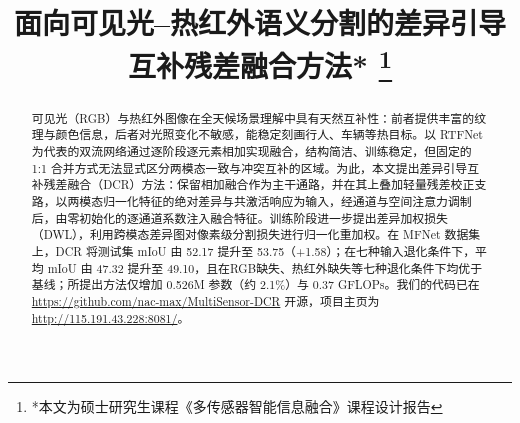 \documentclass[10pt,conference]{IEEEtran}
\begin{document}
\title{面向可见光--热红外语义分割的差异引导互补残差融合方法* %
\thanks{*本文为硕士研究生课程《多传感器智能信息融合》课程设计报告}}

\author{%

\and


\and


\and


}



\maketitle

\begin{abstract}
可见光（RGB）与热红外图像在全天候场景理解中具有天然互补性：前者提供丰富的纹理与颜色信息，后者对光照变化不敏感，能稳定刻画行人、车辆等热目标。以 RTFNet 为代表的双流网络通过逐阶段逐元素相加实现融合，结构简洁、训练稳定，但固定的 1:1 合并方式无法显式区分两模态一致与冲突互补的区域。为此，本文提出差异引导互补残差融合（DCR）方法：保留相加融合作为主干通路，并在其上叠加轻量残差校正支路，以两模态归一化特征的绝对差异与共激活响应为输入，经通道与空间注意力调制后，由零初始化的逐通道系数注入融合特征。训练阶段进一步提出差异加权损失（DWL），利用跨模态差异图对像素级分割损失进行归一化重加权。在 MFNet 数据集上，DCR 将测试集 mIoU 由 52.17 提升至 53.75（+1.58）；在七种输入退化条件下，平均 mIoU 由 47.32 提升至 49.10，且在RGB缺失、热红外缺失等七种退化条件下均优于基线；所提出方法仅增加 0.526M 参数（约 2.1\%）与 0.37 GFLOPs。我们的代码已在 \url{https://github.com/nac-max/MultiSensor-DCR} 开源，项目主页为 \url{http://115.191.43.228:8081/}。
\end{abstract}
\end{document}
